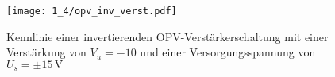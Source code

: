 \begin{figure}[H]
  \begin{center}
    \texttt{[image: 1\_4/opv\_inv\_verst.pdf]}
    \end{center}
    \caption{Kennlinie einer invertierenden OPV-Verstärkerschaltung mit einer Verstärkung von $V_u = -10$ und einer
      Versorgungsspannung von $U_s = \pm 15 \, \si{\volt}$}
 \end{figure}
